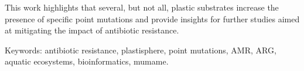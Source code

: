 This work highlights that several, but not all, plastic substrates increase the presence of specific point mutations and provide insights for further studies aimed at mitigating the impact of antibiotic resistance.

\vfill
Keywords: antibiotic resistance, plastisphere, point mutations, AMR, ARG, aquatic ecosystems, bioinformatics, mumame.

\newpage				%
\thispagestyle{empty}
\mbox{}
